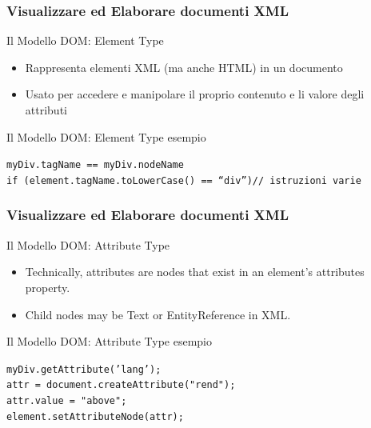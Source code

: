 \begin{frame}
    \frametitle{Visualizzare ed Elaborare documenti XML}
    \addtocounter{nframe}{1}
    

     \begin{block}{Il Modello DOM: Element Type}
        \begin{itemize}
            \item Rappresenta elementi XML (ma anche HTML) in un documento
            \item Usato per accedere e manipolare  il proprio contenuto e li valore degli attributi 
        \end{itemize}
     \end{block}

     \begin{block}{Il Modello DOM: Element Type esempio}

        \texttt{myDiv.tagName == myDiv.nodeName}
        \\\texttt{if (element.tagName.toLowerCase() == “div”){// istruzioni varie}}
       
     \end{block}

\end{frame}

\begin{frame}
    \frametitle{Visualizzare ed Elaborare documenti XML}
    \addtocounter{nframe}{1}
    

     \begin{block}{Il Modello DOM: Attribute Type}
        \begin{itemize}
            \item Technically, attributes are nodes that exist in an element’s attributes property.
            \item Child nodes may be Text or EntityReference in XML.
        \end{itemize}
     \end{block}

     \begin{block}{Il Modello DOM: Attribute Type esempio}

        \texttt{myDiv.getAttribute('lang');}
        \\\texttt{attr = document.createAttribute("rend");} 
        \\\texttt{attr.value = "above";} 
        \\\texttt{element.setAttributeNode(attr);}
       
     \end{block}

\end{frame}

